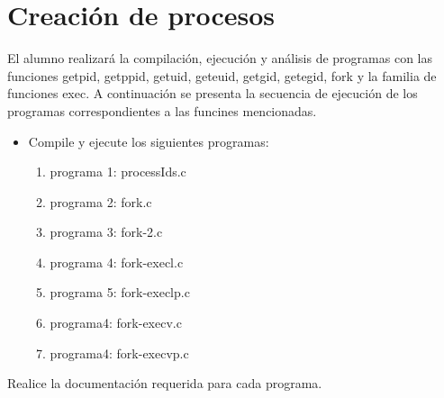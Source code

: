 \section{Creación de procesos}

	El alumno realizará la compilación, ejecución y análisis de programas con las funciones getpid, getppid, getuid, geteuid, getgid, getegid, fork y la familia de funciones exec. A continuación se presenta la secuencia de ejecución de los programas correspondientes a las funcines mencionadas.

\begin{itemize}

	\item Compile y ejecute los siguientes programas:

		\begin{enumerate}

			\item programa 1: processIds.c
			\item programa 2: fork.c
			\item programa 3: fork-2.c
			\item programa 4: fork-execl.c
			\item programa 5: fork-execlp.c
			\item programa4: fork-execv.c
			\item programa4: fork-execvp.c

		\end{enumerate}

\end{itemize}

	Realice la documentación requerida para cada programa.
